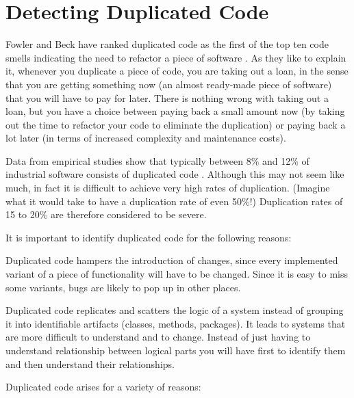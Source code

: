 \documentclass[a4paper,10pt,twoside]{book}
\begin{document}
	\renewcommand{\nnbb}[2]{} %
	\sloppy
\fi
\chapter{Detecting Duplicated Code}

Fowler and Beck have ranked duplicated code as the first of the top ten code smells indicating the need to refactor a piece of software \cite{Fowl99a}. As they like to explain it, whenever you duplicate a piece of code, you are taking out a loan, in the sense that you are getting something now (an almost ready-made piece of software) that you will have to pay for later. There is nothing wrong with taking out a loan, but you have a choice between paying back a small amount now (by taking out the time to refactor your code to eliminate the duplication) or paying back a lot later (in terms of increased complexity and maintenance costs).

Data from empirical studies show that typically between 8\% and 12\% of industrial software consists of duplicated code \cite{Duca99b}. Although this may not seem like much, in fact it is difficult to achieve very high rates of duplication. (Imagine what it would take to have a duplication rate of even 50\%!) Duplication rates of 15 to 20\% are therefore considered to be severe. 

It is important to identify duplicated code for the following reasons:

\begin{bulletlist}
\item Duplicated code hampers the introduction of changes, since every implemented variant of a piece of functionality will have to be changed. Since it is easy to miss some variants, bugs are likely to pop up in other places.

\item Duplicated code replicates and scatters the logic of a system instead of grouping it into identifiable artifacts (classes, methods, packages). It leads to systems that are more difficult to understand and to change. Instead of just having to understand relationship between logical parts you will have first to identify them and then understand their relationships.
\end{bulletlist}

Duplicated code arises for a variety of reasons:
\end{document}
